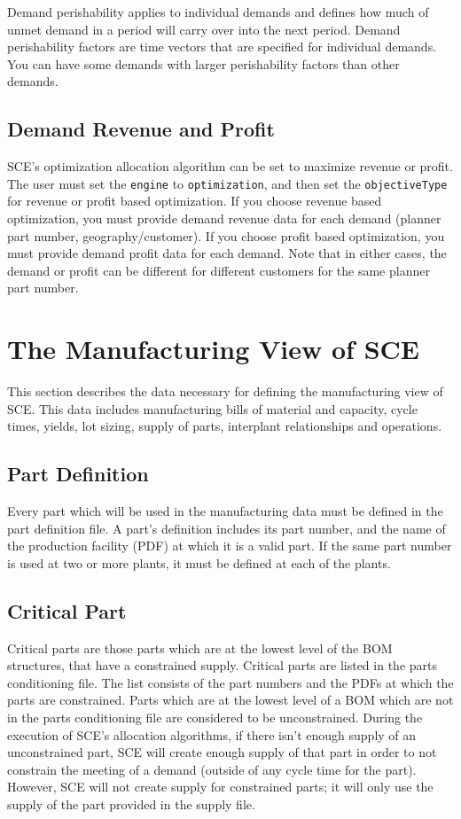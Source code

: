 Demand perishability applies to individual demands and defines how
much of unmet demand in a period will carry over into the next period.
Demand perishability factors are time vectors that are specified for
individual demands.  You can have some demands with larger
perishability factors than other demands.

\subsection{Demand Revenue and Profit}
SCE's optimization allocation algorithm can be set to maximize revenue
or profit.  The user must set the {\tt engine} to {\tt optimization},
and then set the {\tt objectiveType} for revenue or profit based
optimization.  If you choose revenue based optimization, you must
provide demand revenue data for each demand (planner part number,
geography/customer).  If you choose profit based optimization, you
must provide demand profit data for each demand.  Note that in either
cases, the demand or profit can be different for different customers
for the same planner part number.

\section{The Manufacturing View of SCE}
This section describes the data necessary for defining the
manufacturing view of SCE.  This data includes manufacturing bills of
material and capacity, cycle times, yields, lot sizing, supply of
parts, interplant relationships and operations.

\subsection{Part Definition}
Every part which will be used in the manufacturing data must be
defined in the part definition file.  A part's definition includes its
part number, and the name of the production facility (PDF) at which it is
a valid part. If the same part number
is used at two or more plants, it must be defined at each of the
plants.

\subsection{Critical Part}
Critical parts are those parts which are at the lowest level of the
BOM structures, that have a constrained supply.  Critical parts are
listed in the parts conditioning file.  The list consists of the part
numbers and the PDFs at which the parts are constrained.  Parts which
are at the lowest level of a BOM which are not in the parts
conditioning file are considered to be unconstrained.  During the
execution of SCE's allocation algorithms, if there isn't enough supply
of an unconstrained part, SCE will create enough supply of that part
in order to not constrain the meeting of a demand (outside of any
cycle time for the part).  However, SCE will
not create supply for constrained parts; it will only use the supply
of the part provided in the supply file.

